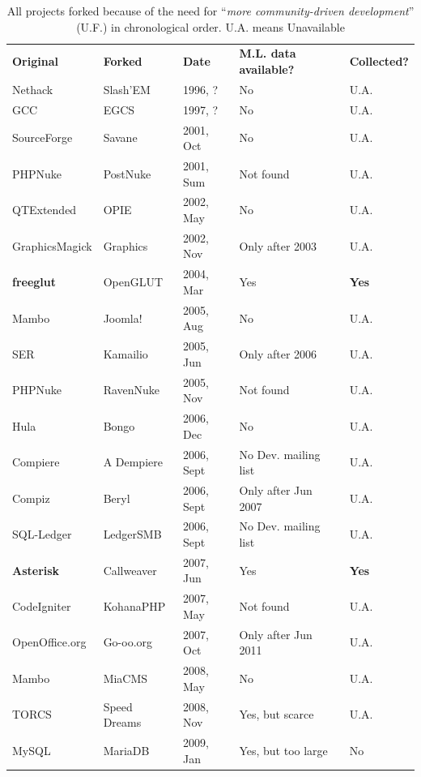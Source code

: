 \documentclass[11pt]{report}
\begin{document}
\begin{table} [H]
\centering
\caption{All projects forked because of the need for ``\textit{more community-driven development}'' (U.F.) \cite{Robles} in chronological order. U.A. means Unavailable}
\label{tableProjectsForkedCat2CommunityDriven}
\begin{tabular}{m{} m{} m{} m{} m{}}
\hline\noalign{\smallskip}
\textbf{Original} & \textbf{Forked} & \textbf{Date} & \textbf{M.L. data available?} & \textbf{Collected?}\\
\noalign{\smallskip}\hline\noalign{\smallskip}
Nethack & Slash'EM & 1996, ? & No & U.A. \\ \hline
GCC & EGCS & 1997, ? & No & U.A. \\ \hline
SourceForge & Savane & 2001, Oct & No & U.A. \\ \hline
PHPNuke & PostNuke & 2001, Sum & Not found & U.A. \\ \hline
QTExtended & OPIE & 2002, May & No & U.A. \\ \hline
GraphicsMagick & Graphics & 2002, Nov  & Only after 2003 & U.A. \\ \hline
\textbf{freeglut} & OpenGLUT & 2004, Mar & Yes & \textbf{Yes} \\ \hline
Mambo & Joomla! & 2005, Aug & No & U.A. \\ \hline
SER & Kamailio & 2005, Jun & Only after 2006 & U.A. \\ \hline
PHPNuke & RavenNuke & 2005, Nov & Not found & U.A. \\ \hline
Hula & Bongo & 2006, Dec & No & U.A. \\ \hline
Compiere & A Dempiere & 2006, Sept & No Dev. mailing list & U.A. \\ \hline
Compiz & Beryl & 2006, Sept & Only after Jun 2007 & U.A. \\ \hline
SQL-Ledger & LedgerSMB & 2006, Sept & No Dev. mailing list & U.A. \\ \hline
\textbf{Asterisk} & Callweaver & 2007, Jun & Yes & \textbf{Yes} \\ \hline
CodeIgniter & KohanaPHP & 2007, May & Not found & U.A. \\ \hline
OpenOffice.org & Go-oo.org & 2007, Oct & Only after Jun 2011 & U.A. \\ \hline
Mambo & MiaCMS & 2008, May & No & U.A. \\ \hline
TORCS & Speed Dreams & 2008, Nov & Yes, but scarce & U.A. \\ \hline
MySQL & MariaDB & 2009, Jan & Yes, but too large & No\\ \hline

\end{tabular}
\end{table}
\end{document}
